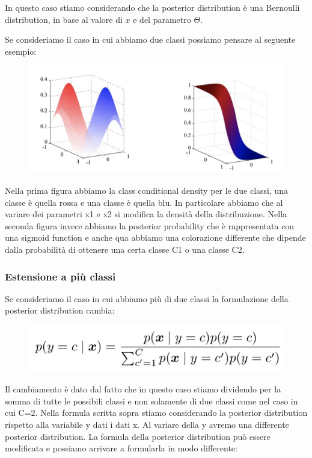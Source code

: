 \documentclass[14pt]{extreport}
\begin{document}
In questo caso stiamo considerando che la posterior distribution è una Bernoulli distribution, in base al valore di $x$ e del parametro $\Theta$.


Se consideriamo il caso in cui abbiamo due classi possiamo pensare al seguente esempio:

\begin{figure}[H]
\centering
\includegraphics[width=0.7\linewidth]{174.jpeg}
\end{figure}

Nella prima figura abbiamo la class conditional density per le due classi, una classe è quella rossa e una classe è quella blu. In particolare abbiamo
che al variare dei parametri x1 e x2 si modifica la densità della distribuzione. Nella seconda figura invece abbiamo la posterior probability che è
rappresentata con una sigmoid function e anche qua abbiamo una colorazione differente che dipende dalla probabilità di ottenere una certa classe C1 o
una classe C2.

\subsubsection{Estensione a più classi}

Se consideriamo il caso in cui abbiamo più di due classi la formulazione della posterior distribution cambia:

\begin{figure}[H]
\centering
\includegraphics[width=0.7\linewidth]{176.jpeg}
\end{figure}

Il cambiamento è dato dal fatto che in questo caso stiamo dividendo per la somma di tutte le possibili classi e non solamente di due classi come nel
caso in cui C=2. Nella formula scritta sopra stiamo considerando la posterior distribution rispetto alla variabile y dati i dati x. Al variare della y
avremo una differente posterior distribution. La formula della posterior distribution può essere modificata e possiamo arrivare a formularla in modo
differente:
\end{document}
